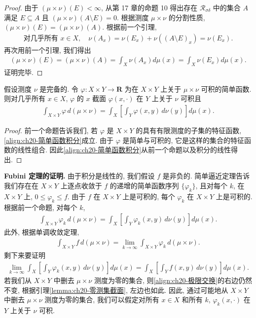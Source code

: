 \documentclass[../../main.tex]{subfiles}
\begin{document}
\begin{proof}
由于 $(\mu\times\nu)(E)<\infty$, 从第 17 章的命题 10 得出存在 $\mathcal{R}_{\sigma\delta}$ 中的集合 $A$ 满足 $E\subseteq A$ 且 $(\mu\times\nu)(A\setminus E)=0$. 根据测度 $\mu\times\nu$ 的分割性质, $(\mu\times\nu)(E)=(\mu\times\nu)(A)$. 根据前一个引理,
\begin{align*}
\text{对几乎所有 }x\in X,\quad\nu(A_{x})=\nu(E_{x})+\nu((A\setminus E)_{x})=\nu(E_{x}).
\end{align*}
再次用前一个引理, 我们得出
\begin{align*}
(\mu\times\nu)(E)=(\mu\times\nu)(A)=\int_{X}\nu(A_{x})d\mu(x)=\int_{X}\nu(E_{x})d\mu(x).
\end{align*}
证明完毕.
\end{proof}

\begin{theorem}\label{theorem:ch20-简单函数截面}
假设测度 $\nu$ 是完备的. 令 $\varphi:X\times Y\to\mathbf{R}$ 为在 $X\times Y$ 上关于 $\mu\times\nu$ 可积的简单函数. 则对几乎所有 $x\in X$, $\varphi$ 的 $x$ 截面 $\varphi(x,\cdot)$ 在 $Y$ 上关于 $\nu$ 可积且
\begin{align}\label{align:ch20-简单函数积分}
\int_{X\times Y}\varphi\,d(\mu\times\nu)=\int_{X}\left[\int_{Y}\varphi(x,y)\,d\nu(y)\right]d\mu(x).
\end{align}
\end{theorem}

\begin{proof}
前一个命题告诉我们, 若 $\varphi$ 是 $X\times Y$ 的具有有限测度的子集的特征函数, \eqref{align:ch20-简单函数积分}成立. 由于 $\varphi$ 是简单与可积的, 它是这样的集合的特征函数的线性组合. 因此\eqref{align:ch20-简单函数积分}从前一个命题以及积分的线性得出.
\end{proof}

\textbf{Fubini 定理的证明.} 由于积分是线性的, 我们假设 $f$ 是非负的. 简单逼近定理告诉我们存在在 $X\times Y$ 上逐点收敛于 $f$ 的递增的简单函数序列 $\{\varphi_{k}\}$, 且对每个 $k$, 在 $X\times Y$ 上, $0\leqslant\varphi_{k}\leqslant f$. 由于 $f$ 在 $X\times Y$ 上是可积的, 每个 $\varphi_{k}$ 在 $X\times Y$ 上是可积的. 根据前一个命题, 对每个 $k$,
\begin{align*}
\int_{X\times Y}\varphi_{k}\,d(\mu\times\nu)=\int_{X}\left[\int_{Y}\varphi_{k}(x,y)\,d\nu(y)\right]d\mu(x).
\end{align*}
此外, 根据单调收敛定理,
\begin{align*}
\int_{X\times Y}f\,d(\mu\times\nu)=\lim_{k\to\infty}\int_{X\times Y}\varphi_{k}\,d(\mu\times\nu).
\end{align*}
剩下来要证明
\begin{align}\label{align:ch20-极限交换}
\lim_{k\to\infty}\int_{X}\left[\int_{Y}\varphi_{k}(x,y)\,d\nu(y)\right]d\mu(x)=\int_{X}\left[\int_{Y}f(x,y)\,d\nu(y)\right]d\mu(x).
\end{align}
若我们从 $X\times Y$ 中删去 $\mu\times\nu$ 测度为零的集合, 则\eqref{align:ch20-极限交换}的右边仍然不变, 根据引理\cref{lemma:ch20-零测集截面}, 左边也如此. 因此, 通过可能地从 $X\times Y$ 中删去 $\mu\times\nu$ 测度为零的集合, 我们可以假定对所有 $x\in X$ 和所有 $k$, $\varphi_{k}(x,\cdot)$ 在 $Y$ 上关于 $\nu$ 可积.
\end{document}
